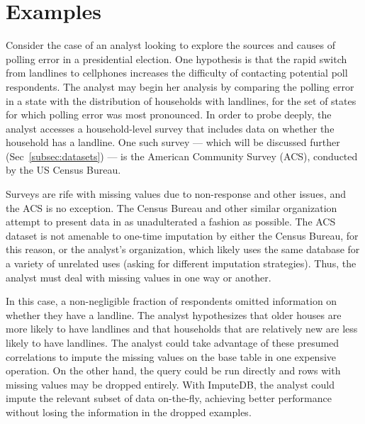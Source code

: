 \section{Examples}

Consider the case of an analyst looking to explore the sources and causes of
polling error in a presidential election. One hypothesis \cite{zukin2015s}
is that the rapid switch from landlines to cellphones increases the
difficulty of contacting potential poll respondents. The analyst may
begin her analysis by comparing the polling error in a state with the
distribution of households with landlines, for the set of states for which
polling error was most pronounced. In order to probe deeply, the analyst
accesses a household-level survey that includes data on
whether the household has a landline. One such survey --- which will be
discussed further (Sec~\ref{subsec:datasets}) --- is the American Community Survey (ACS),
conducted by the US Census Bureau.

Surveys are rife with missing values due to non-response and other issues, and
the ACS is no exception. The Census Bureau and other similar organization attempt to present
data in as unadulterated a fashion as possible. The ACS dataset is not amenable to one-time
imputation by either the Census Bureau, for this reason, or the analyst's organization,
which likely uses the same database for a variety of unrelated uses (asking for different
imputation strategies). Thus, the analyst must deal with missing values in one way or
another.

In this case, a non-negligible fraction of respondents omitted information on whether they
have a landline. The analyst hypothesizes that older houses are more likely to have
landlines and that households that are relatively new are less likely to have landlines. 
The analyst could take advantage of these presumed correlations to impute the missing values
on the base table in one expensive operation. On the other hand, the query could be run
directly and rows with missing values may be dropped entirely. With ImputeDB, the analyst
could impute the relevant subset of data on-the-fly, achieving better performance without
losing the information in the dropped examples.

